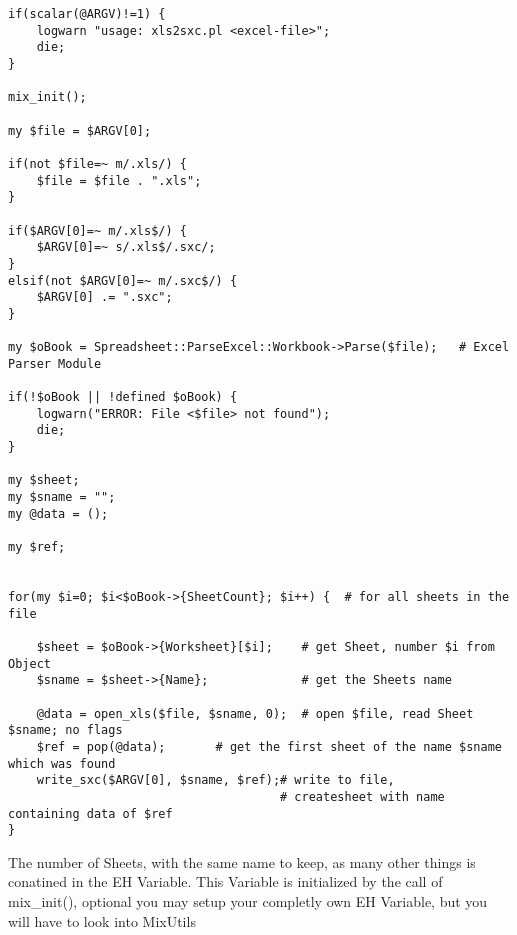 \documentclass[a4paper,12pt]{article}
\begin{document}
\begin{verbatim}
if(scalar(@ARGV)!=1) {
    logwarn "usage: xls2sxc.pl <excel-file>";
    die;
}

mix_init();

my $file = $ARGV[0];

if(not $file=~ m/.xls/) {
    $file = $file . ".xls";
}

if($ARGV[0]=~ m/.xls$/) {
    $ARGV[0]=~ s/.xls$/.sxc/;
} 
elsif(not $ARGV[0]=~ m/.sxc$/) { 
    $ARGV[0] .= ".sxc";
}

my $oBook = Spreadsheet::ParseExcel::Workbook->Parse($file);   # Excel Parser Module

if(!$oBook || !defined $oBook) {
    logwarn("ERROR: File <$file> not found");
    die;
}

my $sheet;
my $sname = "";
my @data = ();

my $ref;


for(my $i=0; $i<$oBook->{SheetCount}; $i++) {  # for all sheets in the file

    $sheet = $oBook->{Worksheet}[$i];    # get Sheet, number $i from Object
    $sname = $sheet->{Name};             # get the Sheets name

    @data = open_xls($file, $sname, 0);  # open $file, read Sheet $sname; no flags
    $ref = pop(@data);       # get the first sheet of the name $sname which was found
    write_sxc($ARGV[0], $sname, $ref);# write to file,
                                      # createsheet with name containing data of $ref 
}

\end{verbatim}
The number of Sheets, with the same name to keep, as many other things is conatined in the EH Variable. This Variable is initialized by the call of mix\_init(), optional you may setup your completly own EH Variable, but you will have to look into MixUtils%
\end{document}
